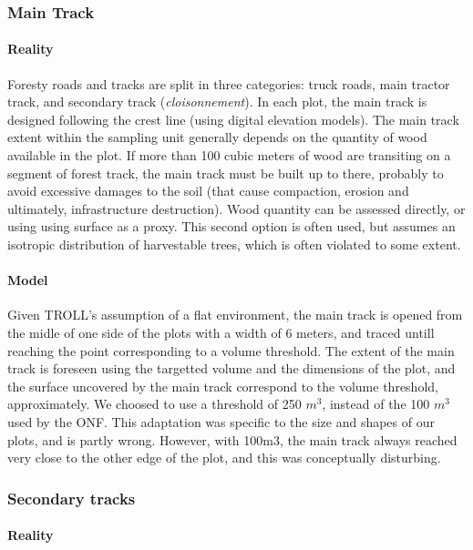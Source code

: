 \documentclass[12pt,]{article}
\theoremstyle{definition}
\theoremstyle{definition}
\theoremstyle{definition}
\theoremstyle{remark}
\begin{document}
\subsubsection{Main Track}\label{main-track}

\paragraph{Reality}\label{reality-3}

Foresty roads and tracks are split in three categories: truck roads,
main tractor track, and secondary track (\emph{cloisonnement}). In each
plot, the main track is designed following the crest line (using digital
elevation models). The main track extent within the sampling unit
generally depends on the quantity of wood available in the plot. If more
than 100 cubic meters of wood are transiting on a segment of forest
track, the main track must be built up to there, probably to avoid
excessive damages to the soil (that cause compaction, erosion and
ultimately, infrastructure destruction). Wood quantity can be assessed
directly, or using using surface as a proxy. This second option is often
used, but assumes an isotropic distribution of harvestable trees, which
is often violated to some extent.

\paragraph{Model}\label{model-4}

Given TROLL's assumption of a flat environment, the main track is opened
from the midle of one side of the plots with a width of 6 meters, and
traced untill reaching the point corresponding to a volume threshold.
The extent of the main track is foreseen using the targetted volume and
the dimensions of the plot, and the surface uncovered by the main track
correspond to the volume threshold, approximately. We choosed to use a
threshold of 250 \(m^3\), instead of the 100 \(m^3\) used by the ONF.
This adaptation was specific to the size and shapes of our plots, and is
partly wrong. However, with 100m3, the main track always reached very
close to the other edge of the plot, and this was conceptually
disturbing.

\subsubsection{Secondary tracks}\label{secondary-tracks}

\paragraph{Reality}\label{reality-4}
\end{document}
